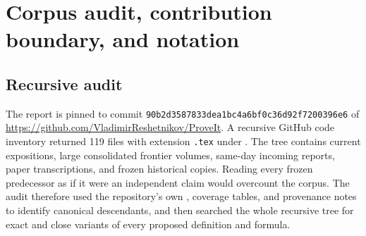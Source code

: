 \documentclass[11pt,oneside]{article}
\theoremstyle{definition}
\theoremstyle{remark}
\begin{document}
\begin{abstract}
The planar family $A^{-1}=qR_\theta$ produces the most concrete new geometry.
Its support has perimeter $4\Norm v q/(1-q)$ and area
\[
 \frac{4\Norm v^2q^2}{1-q^2}
 \sum_{m\ge1}\AbsoluteValue{\sin(m\theta)}q^m.
\]
For rational $\theta/\pi$ this area series is rational in $q$; for irrational
$\theta/\pi$ the unit circle is its natural boundary.  Irrational supports have a
dense set of exposed edges whose union has full boundary length.  Nevertheless,
a natural Abel rescaling makes them converge to a Euclidean disk as $q\uparrow1$;
rational rotations instead converge to finite zonotopes.  Exact directional-cap
Laplace products connect this geometry back to inverse Fabius and Lambert--$W$
questions.  The irrational endpoint modulation is isolated as a conjectural
rotation-cocycle problem.  A fully commented Python program reproduces all
figures and numerical checks.
\end{abstract}

\tableofcontents
\newpage

\section{Corpus audit, contribution boundary, and notation}
\label{sec:audit}

\subsection{Recursive audit}

The report is pinned to commit
\texttt{90b2d3587833dea1bc4a6bf0c36d92f7200396e6} of
\url{https://github.com/VladimirReshetnikov/ProveIt}.  A recursive GitHub code
inventory returned 119 files with extension \texttt{.tex} under
.  The tree contains current expositions,
large consolidated frontier volumes, same-day incoming reports, paper
transcriptions, and frozen historical copies.  Reading every frozen predecessor
as if it were an independent claim would overcount the corpus.  The audit
therefore used the repository's own , coverage tables, and
provenance notes to identify canonical descendants, and then searched the whole
recursive tree for exact and close variants of every proposed definition and
formula.
\end{document}
